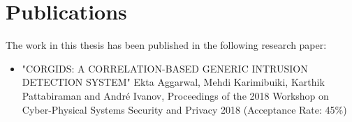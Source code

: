 \section {Publications}
The work in this thesis has been published in the following research paper:
\begin{itemize}
\item "CORGIDS: A CORRELATION-BASED GENERIC INTRUSION DETECTION SYSTEM" Ekta Aggarwal, Mehdi Karimibuiki, Karthik Pattabiraman and Andr\'e Ivanov, Proceedings of the 2018 Workshop on Cyber-Physical Systems Security and Privacy 2018 (Acceptance Rate: 45\%)
\end{itemize}

\endinput
